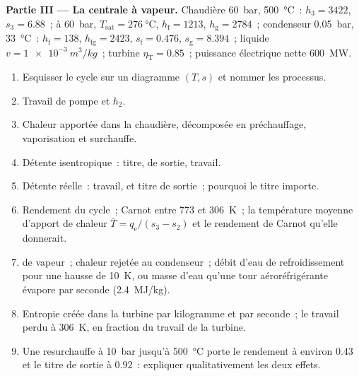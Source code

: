 \begin{problem}
\textbf{Partie III --- La centrale à vapeur.}
Chaudière \qty{60}{bar}, \qty{500}{\celsius}~: $h_3 = 3422$, $s_3 = 6.88$~; à
\qty{60}{bar}, $T_{\text{sat}} = \qty{276}{\celsius}$, $h_{\text{f}} = 1213$,
$h_{\text{g}} = 2784$~; condenseur \qty{0.05}{bar}, \qty{33}{\celsius}~:
$h_{\text{f}} = 138$, $h_{\text{fg}} = 2423$, $s_{\text{f}} = 0.476$, $s_{\text{g}} =
8.394$~; liquide $v = \qty{1e-3}{m^3/kg}$~; turbine $\eta_{\text{T}} = 0.85$~;
puissance électrique nette \qty{600}{MW}.
\begin{enumerate}[resume]
  \item Esquisser le cycle sur un diagramme $(T,s)$ et nommer les processus.
  \item Travail de pompe et $h_2$.
  \item Chaleur apportée dans la chaudière, décomposée en préchauffage, vaporisation
        et surchauffe.
  \item Détente isentropique~: titre,  de sortie, travail.
  \item Détente réelle~: travail,  et titre de sortie~; pourquoi le
        titre importe.
  \item Rendement du cycle~; Carnot entre \qty{773}{} et \qty{306}{K}~;
        la température moyenne d'apport de chaleur $\bar T = q_{\text{e}}/(s_3
        - s_2)$ et le rendement de Carnot qu'elle donnerait.
  \item {} de vapeur~; chaleur rejetée au condenseur~; débit d'eau
        de refroidissement pour une hausse de \qty{10}{K}, ou masse d'eau qu'une tour
        aéroréfrigérante évapore par seconde (\qty{2.4}{MJ/kg}).
  \item Entropie créée dans la turbine par kilogramme et par seconde~;
        le travail perdu à \qty{306}{K}, en fraction du travail de la
        turbine.
  \item Une resurchauffe à \qty{10}{bar} jusqu'à \qty{500}{\celsius} porte le
        rendement à environ $0.43$ et le titre de sortie à $0.92$~:
        expliquer qualitativement les deux effets.
\end{enumerate}


\end{problem}
